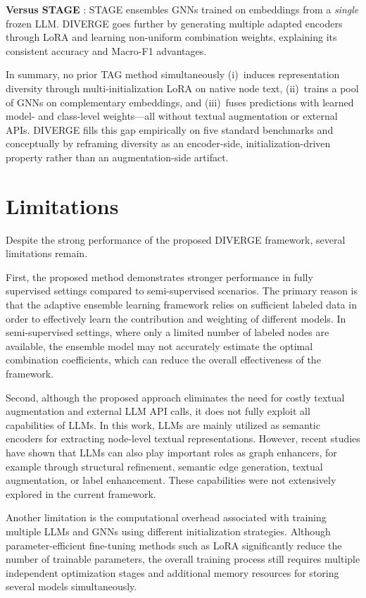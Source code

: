 \documentclass[a4paper,fleqn]{cas-sc}
\begin{document}
\textbf{Versus STAGE} \citep{zolnai-lucas-etal-2024-stage}: STAGE ensembles GNNs trained on embeddings from a \emph{single} frozen LLM. DIVERGE goes further by generating multiple adapted encoders through LoRA and learning non-uniform combination weights, explaining its consistent accuracy and Macro-F1 advantages.

In summary, no prior TAG method simultaneously (i)~induces representation diversity through multi-initialization LoRA on native node text, (ii)~trains a pool of GNNs on complementary embeddings, and (iii)~fuses predictions with learned model- and class-level weights---all without textual augmentation or external APIs. DIVERGE fills this gap empirically on five standard benchmarks and conceptually by reframing diversity as an encoder-side, initialization-driven property rather than an augmentation-side artifact.


\section{Limitations}\label{sec:Limitations}

Despite the strong performance of the proposed DIVERGE framework, several limitations remain.

First, the proposed method demonstrates stronger performance in fully supervised settings compared to semi-supervised scenarios. The primary reason is that the adaptive ensemble learning framework relies on sufficient labeled data in order to effectively learn the contribution and weighting of different models. In semi-supervised settings, where only a limited number of labeled nodes are available, the ensemble model may not accurately estimate the optimal combination coefficients, which can reduce the overall effectiveness of the framework.

Second, although the proposed approach eliminates the need for costly textual augmentation and external LLM API calls, it does not fully exploit all capabilities of LLMs. In this work, LLMs are mainly utilized as semantic encoders for extracting node-level textual representations. However, recent studies have shown that LLMs can also play important roles as graph enhancers, for example through structural refinement, semantic edge generation, textual augmentation, or label enhancement. These capabilities were not extensively explored in the current framework.

Another limitation is the computational overhead associated with training multiple LLMs and GNNs using different initialization strategies. Although parameter-efficient fine-tuning methods such as LoRA significantly reduce the number of trainable parameters, the overall training process still requires multiple independent optimization stages and additional memory resources for storing several models simultaneously.
\end{document}
